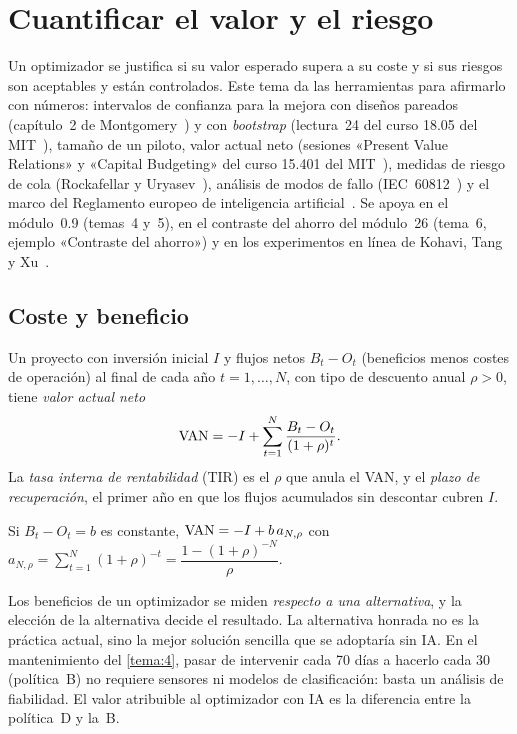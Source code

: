 \chapter{Cuantificar el valor y el riesgo}
\label{tema:5}

Un optimizador se justifica si su valor esperado supera a su coste y si sus riesgos son aceptables y están controlados. Este tema da las herramientas para afirmarlo con números: intervalos de confianza para la mejora con diseños pareados (capítulo~2 de Montgomery~\cite{montgomery}) y con \emph{bootstrap} (lectura~24 del curso 18.05 del MIT~\cite{mit1805}), tamaño de un piloto, valor actual neto (sesiones «Present Value Relations» y «Capital Budgeting» del curso 15.401 del MIT~\cite{mit15401}), medidas de riesgo de cola (Rockafellar y Uryasev~\cite{ru}), análisis de modos de fallo (IEC~60812~\cite{iec60812}) y el marco del Reglamento europeo de inteligencia artificial~\cite{aiact,omnibus}. Se apoya en el módulo~0.9 (temas~4 y~5), en el contraste del ahorro del módulo~26 (tema~6, ejemplo «Contraste del ahorro») y en los experimentos en línea de Kohavi, Tang y Xu~\cite{kohavi}.

\section{Coste y beneficio}

\begin{definicion}\label{def:van}
Un proyecto con inversión inicial $I$ y flujos netos $B_t-O_t$ (beneficios menos costes de operación) al final de cada año $t=1,\dots,N$, con tipo de descuento anual $\rho>0$, tiene \emph{valor actual neto}
\[
\operatorname{VAN}=-I+\sum_{t=1}^{N}\frac{B_t-O_t}{(1+\rho)^{t}}.
\]
La \emph{tasa interna de rentabilidad} (TIR) es el $\rho$ que anula el VAN, y el \emph{plazo de recuperación}, el primer año en que los flujos acumulados sin descontar cubren $I$.
\end{definicion}

\begin{proposicion}[Anualidad]\label{prop:anualidad}
Si $B_t-O_t=b$ es constante, $\operatorname{VAN}=-I+b\,a_{N,\rho}$ con $a_{N,\rho}=\sum_{t=1}^{N}(1+\rho)^{-t}=\dfrac{1-(1+\rho)^{-N}}{\rho}$.
\end{proposicion}

Los beneficios de un optimizador se miden \emph{respecto a una alternativa}, y la elección de la alternativa decide el resultado. La alternativa honrada no es la práctica actual, sino la mejor solución sencilla que se adoptaría sin IA. En el mantenimiento del \cref{tema:4}, pasar de intervenir cada 70 días a hacerlo cada 30 (política~B) no requiere sensores ni modelos de clasificación: basta un análisis de fiabilidad. El valor atribuible al optimizador con IA es la diferencia entre la política~D y la~B.

